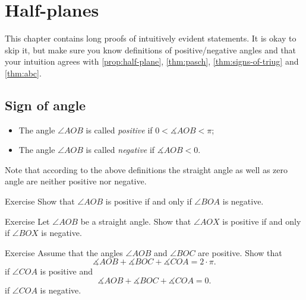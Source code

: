 \chapter{Half-planes}\label{chap:half-planes}

This chapter contains long proofs of intuitively evident statements.
It is okay to skip it, but make sure you know definitions of positive/negative angles and that your intuition agrees with \ref{prop:half-plane}, \ref{thm:pasch}, \ref{thm:signs-of-triug} and \ref{thm:abc}.

 
                            
\section*{Sign of angle}

\begin{itemize}
\item The angle $\angle A O B$ is called \emph{positive} 
if $0<\measuredangle A O B<\pi$;
\item The  angle $\angle A O B$ is called {}\emph{negative} 
if $\measuredangle A O B<0$.
\end{itemize}

Note that according to the above definitions the straight angle as well as zero angle 
are neither positive nor negative.

\begin{thm}{Exercise}\label{ex:AOB+<=>BOA-}
Show that $\angle A O B$ is positive if and only if $\angle B O A$ is negative.
\end{thm}

\begin{thm}{Exercise}\label{ex:straight-sign}
Let $\angle AOB$ be a straight angle.
Show that $\angle AOX$ is positive 
if and only if $\angle BOX$ is negative.
\end{thm}

\begin{thm}{Exercise}\label{ex:PP(PN)}
Assume that the angles $\angle AOB$ and $\angle BOC$ are positive. 
Show that
$$\measuredangle AOB+\measuredangle BOC+\measuredangle COA=2\cdot\pi.$$
if $\angle COA$ is positive
and
$$\measuredangle AOB+\measuredangle BOC+\measuredangle COA=0.$$
if $\angle COA$ is negative.
\end{thm}




